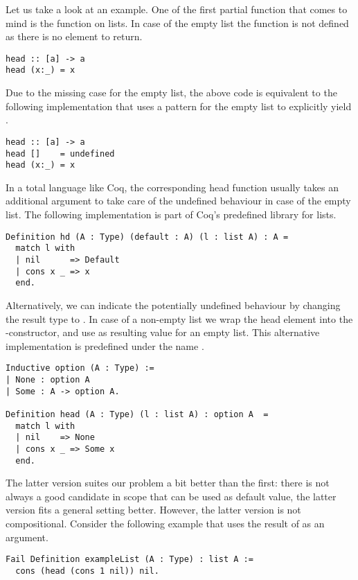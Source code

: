 Let us take a look at an example.
One of the first partial function that comes to mind is the  function on lists.
In case of the empty list the function is not defined as there is no element to return.

\begin{verbatim}
head :: [a] -> a
head (x:_) = x
\end{verbatim}

\noindent 
Due to the missing case for the empty list, the above code is equivalent to the following implementation that uses a pattern for the empty list to explicitly yield .

\begin{verbatim}
head :: [a] -> a
head []    = undefined
head (x:_) = x
\end{verbatim}

In a total language like Coq, the corresponding head function usually takes an additional argument to take care of the undefined behaviour in case of the empty list.
The following implementation is part of Coq's predefined library for lists.

\begin{verbatim}
Definition hd (A : Type) (default : A) (l : list A) : A = 
  match l with
  | nil      => Default
  | cons x _ => x
  end.
\end{verbatim}

Alternatively, we can indicate the potentially undefined behaviour by changing the result type to .
In case of a non-empty list we wrap the head element into the -constructor, and use  as resulting value for an empty list.
This alternative implementation is predefined under the name .

\begin{verbatim}
Inductive option (A : Type) :=
| None : option A
| Some : A -> option A.

Definition head (A : Type) (l : list A) : option A  = 
  match l with
  | nil    => None
  | cons x _ => Some x
  end.
\end{verbatim}

The latter version suites our problem a bit better than the first: there is not always a good candidate in scope that can be used as default value, the latter version fits a general setting better.
However, the latter version is not compositional.
Consider the following example that uses the result of  as an argument.

\begin{verbatim}
Fail Definition exampleList (A : Type) : list A :=
  cons (head (cons 1 nil)) nil.
\end{verbatim}

